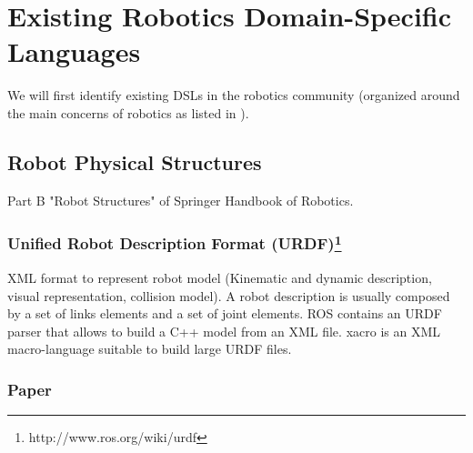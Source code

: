 \documentclass[doc]{apa}
\begin{document}
\section{Existing Robotics Domain-Specific Languages} %
\label{sec:Existing_Robotics_Domain-Specific_Languages}
We will first identify existing DSLs in the robotics community (organized around the main concerns of robotics as listed in \cite{SpringerHandbook:2008fk}).
\subsection{Robot Physical Structures}
Part B "Robot Structures" of Springer Handbook of Robotics.

\subsubsection{Unified Robot Description Format (URDF)\footnote{http://www.ros.org/wiki/urdf}}
XML format to represent robot model (Kinematic and dynamic description, visual representation, collision model).
A robot description is usually composed by a set of links elements and a set of joint elements.
ROS contains an URDF parser that allows to build a C++ model from an XML file.
xacro is an XML macro-language suitable to build large URDF files.

\subsubsection{Paper\cite{Brugali:2007uq}}



\end{document}
